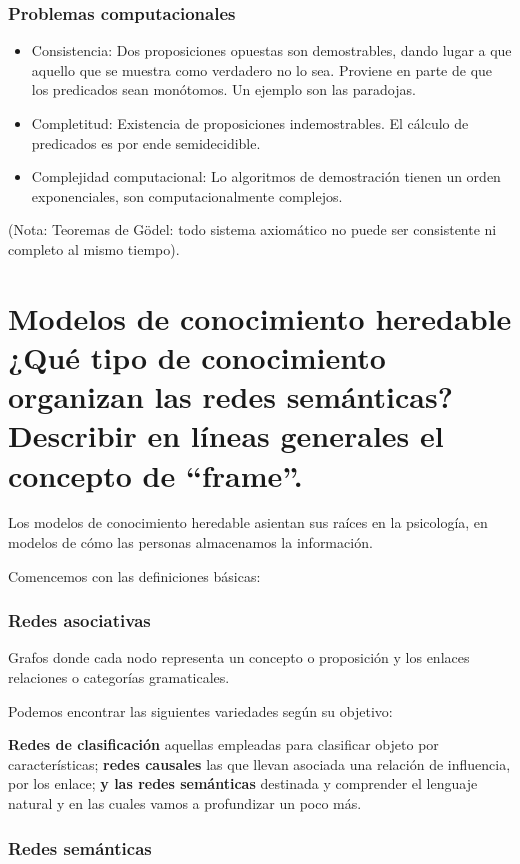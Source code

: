 \documentclass[12 pt, a4paper]{article}
\begin{document}
\subsubsection*{Problemas computacionales}

\begin{itemize}
  \item Consistencia: Dos proposiciones opuestas son demostrables, dando lugar a que aquello que se 
  muestra como verdadero no lo sea. Proviene en parte de que los predicados sean monótomos. Un ejemplo son las paradojas. 
  \item Completitud: Existencia de proposiciones indemostrables. El cálculo de predicados es por ende semidecidible.
  \item Complejidad computacional: Lo algoritmos de demostración tienen un orden exponenciales, son computacionalmente complejos.
\end{itemize}
(Nota: Teoremas de Gödel: todo sistema axiomático no puede ser consistente ni completo al mismo tiempo).
\newpage


\section{Modelos de conocimiento heredable ¿Qué tipo de conocimiento organizan las redes semánticas? Describir en líneas generales el concepto de “frame”.}

Los modelos de conocimiento heredable asientan sus raíces en la psicología, 
en modelos de cómo las personas almacenamos la información. 

Comencemos con las definiciones básicas:

\subsubsection*{Redes asociativas}  
Grafos donde cada nodo representa un concepto o proposición y los enlaces relaciones o categorías gramaticales.

Podemos encontrar las siguientes variedades según su objetivo:

\textbf{Redes de clasificación} aquellas empleadas para clasificar objeto por características;
\textbf{redes causales} las que llevan asociada una relación de influencia, por los enlace; 
\textbf{y las redes semánticas} destinada y comprender el lenguaje natural y en las cuales vamos a profundizar un poco más. 


\subsubsection*{Redes semánticas}  
\end{document}
